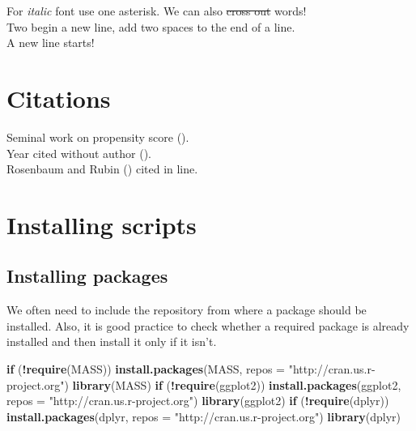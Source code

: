 \documentclass[
]{article}
\newenvironment{Shaded}{\begin{snugshade}}{\end{snugshade}}
\newcommand{\AttributeTok}[1]{\textcolor[rgb]{0.13,0.29,0.53}{#1}}
\newcommand{\ControlFlowTok}[1]{\textcolor[rgb]{0.13,0.29,0.53}{\textbf{#1}}}
\newcommand{\FunctionTok}[1]{\textcolor[rgb]{0.13,0.29,0.53}{\textbf{#1}}}
\newcommand{\NormalTok}[1]{#1}
\newcommand{\SpecialCharTok}[1]{\textcolor[rgb]{0.81,0.36,0.00}{\textbf{#1}}}
\newcommand{\StringTok}[1]{\textcolor[rgb]{0.31,0.60,0.02}{#1}}
\begin{document}
For \emph{italic} font use one asterisk. We can also \st{cross out}
words!\\
Two begin a new line, add two spaces to the end of a line.\\
A new line starts!

\section{Citations}\label{citations}

Seminal work on propensity score
().\\
Year cited without author ().\\
Rosenbaum and Rubin () cited in
line.

\section{Installing scripts}\label{installing-scripts}

\subsection{Installing packages}\label{installing-packages}

We often need to include the repository from where a package should be
installed. Also, it is good practice to check whether a required package
is already installed and then install it only if it isn't.

\begin{Shaded}
\begin{Highlighting}[]
\ControlFlowTok{if}\NormalTok{ (}\SpecialCharTok{!}\FunctionTok{require}\NormalTok{(}\StringTok{\textquotesingle{}MASS\textquotesingle{}}\NormalTok{)) }\FunctionTok{install.packages}\NormalTok{(}\StringTok{\textquotesingle{}MASS\textquotesingle{}}\NormalTok{, }\AttributeTok{repos =} \StringTok{"http://cran.us.r{-}project.org"}\NormalTok{)}
\FunctionTok{library}\NormalTok{(}\StringTok{\textquotesingle{}MASS\textquotesingle{}}\NormalTok{) }
\ControlFlowTok{if}\NormalTok{ (}\SpecialCharTok{!}\FunctionTok{require}\NormalTok{(}\StringTok{\textquotesingle{}ggplot2\textquotesingle{}}\NormalTok{)) }\FunctionTok{install.packages}\NormalTok{(}\StringTok{\textquotesingle{}ggplot2\textquotesingle{}}\NormalTok{, }\AttributeTok{repos =} \StringTok{"http://cran.us.r{-}project.org"}\NormalTok{)}
\FunctionTok{library}\NormalTok{(}\StringTok{\textquotesingle{}ggplot2\textquotesingle{}}\NormalTok{) }
\ControlFlowTok{if}\NormalTok{ (}\SpecialCharTok{!}\FunctionTok{require}\NormalTok{(}\StringTok{\textquotesingle{}dplyr\textquotesingle{}}\NormalTok{)) }\FunctionTok{install.packages}\NormalTok{(}\StringTok{\textquotesingle{}dplyr\textquotesingle{}}\NormalTok{, }\AttributeTok{repos =} \StringTok{"http://cran.us.r{-}project.org"}\NormalTok{)}
\FunctionTok{library}\NormalTok{(}\StringTok{\textquotesingle{}dplyr\textquotesingle{}}\NormalTok{) }
\end{Highlighting}
\end{Shaded}
\end{document}

